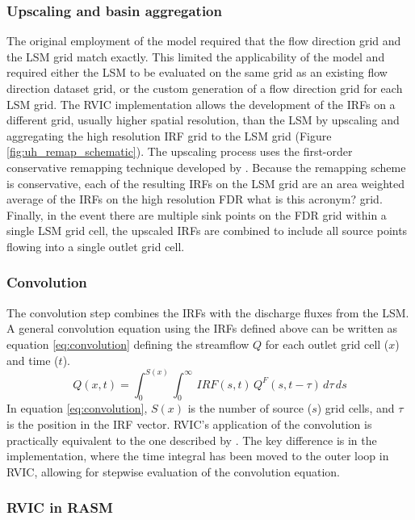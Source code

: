 \documentclass[jgrga, draft]{agutex}
\begin{document}
\begin{article}
\subsubsection{Upscaling and basin aggregation}
\label{sec:remap}

The original employment of the \citet{Lohmann_1996} model required that the flow direction grid and the LSM grid match exactly.
This limited the applicability of the model and required either the LSM to be evaluated on the same grid as an existing flow direction dataset grid, or the custom generation of a flow direction grid for each LSM grid.
The RVIC implementation allows the development of the IRFs on a different grid, usually higher spatial resolution, than the LSM by upscaling and aggregating the high resolution IRF grid to the LSM grid (Figure \ref{fig:uh_remap_schematic}).
The upscaling process uses the first-order conservative remapping technique developed by \citep{Jones_1999}.
Because the remapping scheme is conservative, each of the resulting IRFs on the LSM grid are an area weighted average of the IRFs on the high resolution FDR {what is this acronym?} grid.
Finally, in the event there are multiple sink points on the FDR grid within a single LSM grid cell, the upscaled IRFs are combined to include all source points flowing into a single outlet grid cell.

\subsubsection{Convolution}
\label{sec:convolution}

The convolution step combines the IRFs with the discharge fluxes from the LSM.
A general convolution equation using the IRFs defined above can be written as equation \ref{eq:convolution} defining the streamflow $Q$ for each outlet grid cell ($x$) and time ($t$).
\begin{equation}
  \label{eq:convolution}
   Q(x,t) = \int_0^{S(x)} \int_0^{\infty}\,IRF(s,t)\,Q^F(s,t-\tau)\,d\tau\,ds
 \end{equation}
In equation \ref{eq:convolution}, $S(x)$ is the number of source ($s$) grid cells, and $\tau$ is the position in the IRF vector.
RVIC's application of the convolution is practically equivalent to the one described by \citet{Lohmann_1996}.
The key difference is in the implementation, where the time integral has been moved to the outer loop in RVIC, allowing for stepwise evaluation of the convolution equation.

\subsubsection{RVIC in RASM}


\end{article}
\end{document}
